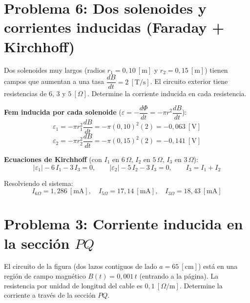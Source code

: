 \documentclass[12pt,letterpaper]{article}
\begin{document}
\vspace{0.6cm}

\section*{Problema 6: Dos solenoides y corrientes inducidas (Faraday + Kirchhoff)}

\noindent Dos solenoides muy largos (radios $r_1 = 0{,}10\ [\text{m}]$ y $r_2 = 0{,}15\ [\text{m}]$)
tienen campos que aumentan a una tasa $\dfrac{dB}{dt} = 2\ [\text{T/s}]$. El circuito exterior
tiene resistencias de $6$, $3$ y $5\ [\Omega]$. Determine la corriente inducida en cada
resistencia.

\medskip

\noindent\textbf{Fem inducida por cada solenoide} ($\varepsilon = -\dfrac{d\Phi}{dt} = -\pi r^2\dfrac{dB}{dt}$):
\[
    \varepsilon_1 = -\pi r_1^2\frac{dB}{dt} = -\pi(0{,}10)^2(2) = -0{,}063\ [\text{V}]
\]
\[
    \varepsilon_2 = -\pi r_2^2\frac{dB}{dt} = -\pi(0{,}15)^2(2) = -0{,}141\ [\text{V}]
\]

\noindent\textbf{Ecuaciones de Kirchhoff} (con $I_1$ en $6\,\Omega$, $I_2$ en $5\,\Omega$,
$I_3$ en $3\,\Omega$):
\[
    |\varepsilon_1| - 6\,I_1 - 3\,I_3 = 0,\qquad
    |\varepsilon_2| - 5\,I_2 - 3\,I_3 = 0,\qquad
    I_3 = I_1 + I_2
\]

\noindent Resolviendo el sistema:
\[
    \boxed{I_{6\Omega} = 1{,}286\ [\text{mA}],\quad
           I_{5\Omega} = 17{,}14\ [\text{mA}],\quad
           I_{3\Omega} = 18{,}43\ [\text{mA}]}
\]

\newpage

\section*{Problema 3: Corriente inducida en la secci\'on $PQ$}

\noindent El circuito de la figura (dos lazos contiguos de lado $a = 65\ [\text{cm}]$) est\'a en
una regi\'on de campo magn\'etico $B(t) = 0{,}001\,t$ (entrando a la p\'agina). La resistencia por
unidad de longitud del cable es $0{,}1\ [\Omega/\text{m}]$. Determine la corriente a trav\'es de
la secci\'on $PQ$.
\end{document}
